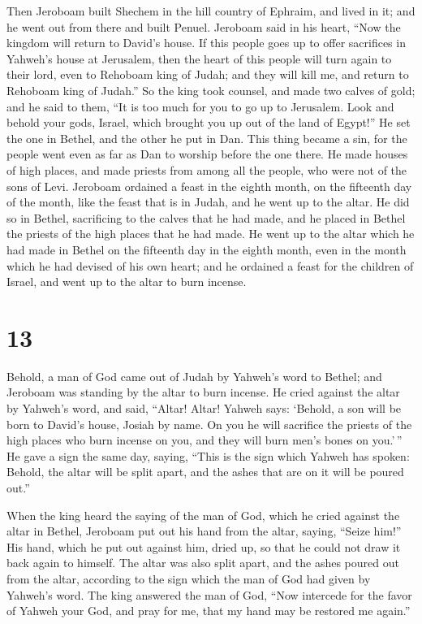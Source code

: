  Then Jeroboam built Shechem in the hill country of
Ephraim, and lived in it; and he went out from there and built Penuel.
 Jeroboam said in his heart, ``Now the kingdom will
return to David's house.  If this people goes up to offer
sacrifices in Yahweh's house at Jerusalem, then the heart of this people
will turn again to their lord, even to Rehoboam king of Judah; and they
will kill me, and return to Rehoboam king of Judah.''  So
the king took counsel, and made two calves of gold; and he said to them,
``It is too much for you to go up to Jerusalem. Look and behold your
gods, Israel, which brought you up out of the land of Egypt!''
 He set the one in Bethel, and the other he put in Dan.
 This thing became a sin, for the people went even as far
as Dan to worship before the one there.  He made houses
of high places, and made priests from among all the people, who were not
of the sons of Levi.  Jeroboam ordained a feast in the
eighth month, on the fifteenth day of the month, like the feast that is
in Judah, and he went up to the altar. He did so in Bethel, sacrificing
to the calves that he had made, and he placed in Bethel the priests of
the high places that he had made.  He went up to the
altar which he had made in Bethel on the fifteenth day in the eighth
month, even in the month which he had devised of his own heart; and he
ordained a feast for the children of Israel, and went up to the altar to
burn incense.

\hypertarget{section-12}{%
\section{13}\label{section-12}}

 Behold, a man of God came out of Judah by Yahweh's word
to Bethel; and Jeroboam was standing by the altar to burn incense.
 He cried against the altar by Yahweh's word, and said,
``Altar! Altar! Yahweh says: `Behold, a son will be born to David's
house, Josiah by name. On you he will sacrifice the priests of the high
places who burn incense on you, and they will burn men's bones on
you.'\,''  He gave a sign the same day, saying, ``This is
the sign which Yahweh has spoken: Behold, the altar will be split apart,
and the ashes that are on it will be poured out.''

 When the king heard the saying of the man of God, which
he cried against the altar in Bethel, Jeroboam put out his hand from the
altar, saying, ``Seize him!'' His hand, which he put out against him,
dried up, so that he could not draw it back again to himself.
 The altar was also split apart, and the ashes poured out
from the altar, according to the sign which the man of God had given by
Yahweh's word.  The king answered the man of God, ``Now
intercede for the favor of Yahweh your God, and pray for me, that my
hand may be restored me again.''

